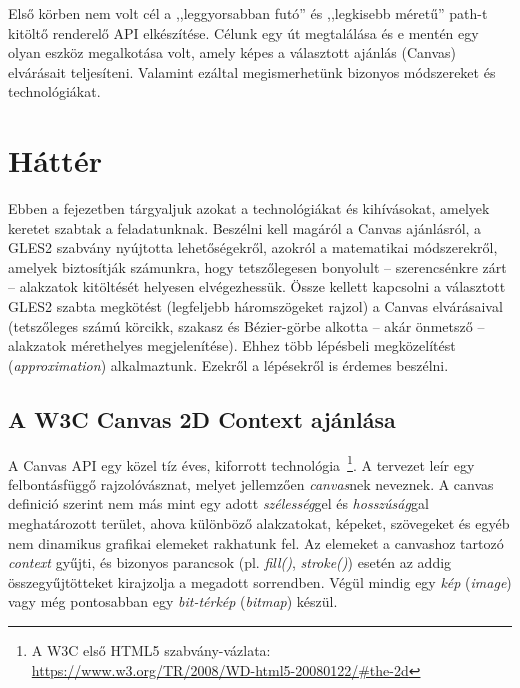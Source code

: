 \documentclass[12pt]{report}
\theoremstyle{definition}
\newcommand{\inenglish}[1]{\textsl{#1}}
\begin{document}
  Első körben nem volt cél a ,,leggyorsabban futó'' és ,,legkisebb
méretű'' path-t kitöltő renderelő API elkészítése. Célunk egy út
megtalálása és e mentén egy olyan eszköz megalkotása volt, amely képes
a választott ajánlás (Canvas) elvárásait teljesíteni. Valamint ezáltal
megismerhetünk bizonyos módszereket és technológiákat.



    \chapter{Háttér}
    \label{Háttér}

  Ebben a fejezetben tárgyaljuk azokat a technológiákat és kihívásokat,
amelyek keretet szabtak a feladatunknak. Beszélni kell magáról a Canvas
ajánlásról, a GLES2 szabvány nyújtotta lehetőségekről, azokról a
matematikai módszerekről, amelyek biztosítják számunkra, hogy
tetszőlegesen bonyolult -- szerencsénkre zárt -- alakzatok kitöltését
helyesen elvégezhessük. Össze kellett kapcsolni a választott GLES2
szabta megkötést (legfeljebb háromszögeket rajzol) a Canvas
elvárásaival (tetszőleges számú körcikk, szakasz és Bézier-görbe
alkotta -- akár önmetsző -- alakzatok mérethelyes megjelenítése). Ehhez
több lépésbeli megközelítést (\inenglish{approximation}) alkalmaztunk.
Ezekről a lépésekről is érdemes beszélni.

    \section[A Canvas ajánlás]{A W3C Canvas 2D Context ajánlása}
    \label{A Canvas ajánlás}

  A Canvas API egy közel tíz éves, kiforrott technológia~\footnote{A W3C
első HTML5 szabvány-vázlata:\\ \footnotesize{
\url{https://www.w3.org/TR/2008/WD-html5-20080122/\#the-2d}}}. A
tervezet leír egy felbontásfüggő rajzolóvásznat, melyet jellemzően
\emph{canvas}nek neveznek. A canvas definició szerint nem más mint egy
adott \emph{szélesség}gel és \emph{hosszúság}gal meghatározott terület,
ahova különböző alakzatokat, képeket, szövegeket és egyéb nem dinamikus
grafikai elemeket rakhatunk fel. Az elemeket a canvashoz tartozó
\emph{context} gyűjti, és bizonyos parancsok (pl. \emph{fill()},
\emph{stroke()}) esetén az addig összegyűjtötteket kirajzolja a
megadott sorrendben. Végül mindig egy \emph{kép} (\inenglish{image})
vagy még pontosabban egy \emph{bit-térkép} (\inenglish{bitmap}) készül.
\end{document}
